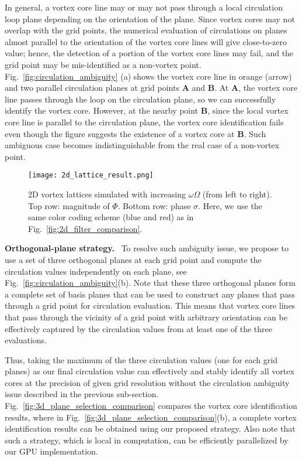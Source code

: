 \documentclass[10pt,journal,compsoc,twoside]{IEEEtran}
\begin{document}
	In general, a vortex core line may or may not pass through a local circulation loop plane depending on the orientation of the plane.
	Since vortex cores may not overlap with the grid points, the numerical evaluation of circulations on planes almost parallel to the orientation of the vortex core lines will give close-to-zero value; hence, the detection of a portion of the vortex core lines may fail, and the grid point may be mis-identified as a non-vortex point.
	Fig.~\ref{fig:circulation_ambiguity} (a) shows the vortex core line in orange (arrow) and two parallel circulation planes at grid points \textbf{A} and \textbf{B}.
	At \textbf{A}, the vortex core line passes through the loop on the circulation plane, so we can successfully identify the vortex core.
	However, at the nearby point \textbf{B}, since the local vortex core line is parallel to the circulation plane, the vortex core identification fails even though the figure suggests the existence of a vortex core at \textbf{B}.
	Such ambiguous case becomes indistinguishable from the real case of a non-vortex point.
	
	
	\begin{figure}
		\centering
		\texttt{[image: 2d\_lattice\_result.png]}
		\caption{2D vortex lattices simulated with increasing $\omega \Omega$ (from left to right).
			Top row: magnitude of $\Phi$.
			Bottom row: phase $\sigma$.
			Here, we use the same color coding scheme (blue and red) as in Fig.~\ref{fig:2d_filter_comparison}.}
		\label{fig:2d_lattice_result}
	\end{figure}


	\vspace{0.15cm}
	\noindent
	\textbf{Orthogonal-plane strategy.} \
	To resolve such ambiguity issue, we propose to use a set of three orthogonal planes at each grid point and compute the circulation values independently on each plane, see Fig.~\ref{fig:circulation_ambiguity}(b).
	Note that these three orthogonal planes form a complete set of basis planes that can be used to construct any planes that pass through a grid point for circulation evaluation.
	This means that vortex core lines that pass through the vicinity of a grid point with arbitrary orientation can be effectively captured by the circulation values from at least one of the three evaluations.
	
	Thus, taking the maximum of the three circulation values (one for each grid planes) as our final circulation value can effectively and stably identify all vortex cores at the precision of given grid resolution without the circulation ambiguity issue described in the previous sub-section.
	Fig.~\ref{fig:3d_plane_selection_comparison} compares the vortex core identification results, where in Fig.~\ref{fig:3d_plane_selection_comparison}(b), a complete vortex identification results can be obtained using our proposed strategy.
	Also note that such a strategy, which is local in computation, can be efficiently parallelized by our GPU implementation.
	
\end{document}

